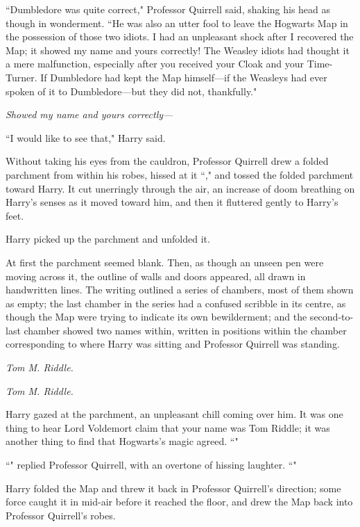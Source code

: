``Dumbledore was quite correct," Professor Quirrell said, shaking his head as though in wonderment. ``He was also an utter fool to leave the Hogwarts Map in the possession of those two idiots. I had an unpleasant shock after I recovered the Map; it showed my name and yours correctly! The Weasley idiots had thought it a mere malfunction, especially after you received your Cloak and your Time-Turner. If Dumbledore had kept the Map himself—if the Weasleys had ever spoken of it to Dumbledore—but they did not, thankfully."

\emph{Showed my name and yours correctly—}

``I would like to see that," Harry said.

Without taking his eyes from the cauldron, Professor Quirrell drew a folded parchment from within his robes, hissed at it ``," and tossed the folded parchment toward Harry. It cut unerringly through the air, an increase of doom breathing on Harry's senses as it moved toward him, and then it fluttered gently to Harry's feet.

Harry picked up the parchment and unfolded it.

At first the parchment seemed blank. Then, as though an unseen pen were moving across it, the outline of walls and doors appeared, all drawn in handwritten lines. The writing outlined a series of chambers, most of them shown as empty; the last chamber in the series had a confused scribble in its centre, as though the Map were trying to indicate its own bewilderment; and the second-to-last chamber showed two names within, written in positions within the chamber corresponding to where Harry was sitting and Professor Quirrell was standing.

\emph{Tom M. Riddle.}

\emph{Tom M. Riddle.}

Harry gazed at the parchment, an unpleasant chill coming over him. It was one thing to hear Lord Voldemort claim that your name was Tom Riddle; it was another thing to find that Hogwarts's magic agreed. ``"

``" replied Professor Quirrell, with an overtone of hissing laughter. ``"

Harry folded the Map and threw it back in Professor Quirrell's direction; some force caught it in mid-air before it reached the floor, and drew the Map back into Professor Quirrell's robes.

